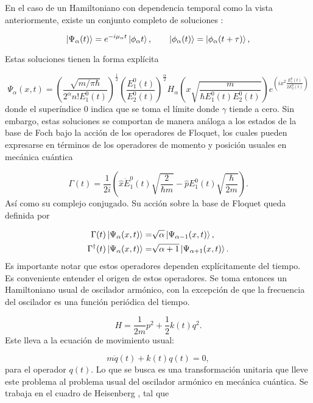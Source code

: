 \documentclass[a4paper,10pt]{report}
\begin{document}
En el caso de un Hamiltoniano con dependencia temporal como la vista anteriormente, existe un conjunto completo de soluciones \cite{BarnettSD}:

\begin{equation}
\Ket{\Psi_\alpha (t)} = e^{-i\mu_\alpha t}\Ket{\phi_\alpha t}, \qquad \Ket{\phi_\alpha (t)}=\Ket{\phi_\alpha (t+\tau)},
\end{equation}

Estas soluciones tienen la forma explícita\cite{BrownPT}

\begin{equation}
\Psi_\alpha (x,t) = (\frac{\sqrt{m/\pi\hbar}}{2^\alpha n!E_1^0(t)})^{\frac{1}{2}}(\frac{E_1^0(t)}{E_2^0(t)})^\frac{\alpha}{2}H_\alpha(x\sqrt{\frac{m}{\hbar E_1^0(t) E_2^0(t)}})e^{(ix^2\frac{E_1^0(t)}{2E_2^0(t)})}
\end{equation} donde el superíndice 0 indica que se toma el límite donde $\gamma$ tiende a cero. Sin embargo, estas soluciones se comportan de manera análoga a los estados de la base de Foch bajo la acción de los operadores de Floquet, los cuales pueden expresarse en términos de los operadores de momento y posición usuales en mecánica cuántica

\begin{equation}
\Gamma(t) = \frac{1}{2i}(\hat{x}\dot{E}_1^0(t)\sqrt{\frac{2}{\hbar m}}-\hat{p}E_1^0(t)\sqrt{\frac{\hbar}{2m}}).
\end{equation} Así como su complejo conjugado. Su acción sobre la base de Floquet queda definida por

\begin{align*}\label{FloquetOperators}
\Gamma(t) \Ket{\Psi_\alpha (x,t)} =& \sqrt{\alpha}\Ket{\Psi_{\alpha-1} (x,t)}, \\
\Gamma^\dagger(t) \Ket{\Psi_\alpha (x,t)} =& \sqrt{\alpha+1}\Ket{\Psi_{\alpha+1} (x,t)}.
\end{align*}Es importante notar que estos operadores dependen explícitamente del tiempo. Es conveniente entender el origen de estos operadores. Se toma entonces un Hamiltoniano usual de oscilador armónico, con la excepción de que la frecuencia del oscilador es una función periódica del tiempo.

\begin{equation}\label{TDHO}
H = \frac{1}{2m}p^2 + \frac{1}{2}k(t)q^2.
\end{equation} Este lleva a la ecuación de movimiento usual:

\begin{equation}
m\ddot{q}(t) + k(t)q(t) = 0,
\end{equation} para el operador $q(t)$. Lo que se busca es una transformación unitaria que lleve este problema al problema usual del oscilador armónico en mecánica cuántica. Se trabaja en el cuadro de Heisenberg \cite{SakuraiQM}, tal que
\end{document}
